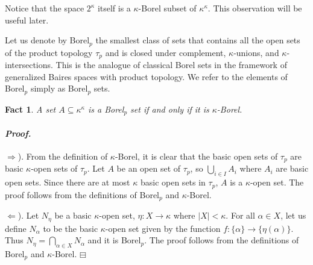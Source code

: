 \documentclass[12pt,a4paper]{amsart}
\newtheorem{thm}{Theorem}[section]
\newtheorem{fact}[thm]{Fact}
\theoremstyle{definition}
\theoremstyle{remark}
\newenvironment{cproof}{\paragraph{\emph{Proof.\,}}}{\hfill{$\boxminus$}\par\vspace{2mm}}
\begin{document}

Notice that the space $2^\kappa$ itself is a $\kappa$-Borel subset of $\kappa^\kappa$. This observation will be useful later.


Let us denote by Borel\hspace{1pt}$_p$ the smallest class of sets that contains all the open sets of the product topology $\tau_p$ and is closed under complement, $\kappa$-unions, and $\kappa$-intersections. This is the analogue of classical Borel sets in the framework of generalized Baires spaces with product topology. We refer to the elements of Borel\hspace{1pt}$_p$ simply as Borel\hspace{1pt}$_p$ sets. 

\begin{fact}\label{2.7}
    A set $A\subseteq \kappa^\kappa$ is a Borel\hspace{1pt}$_p$ set if and only if it is  $\kappa$-Borel.
\end{fact}
\begin{cproof}
    $\Rightarrow$). From the definition of $\kappa$-Borel, it is clear that the basic open sets of $\tau_p$ are basic $\kappa$-open sets of $\tau_p$. Let $A$ be an open set of $\tau_p$, so $\bigcup_{i\in I}A_i$ where $A_i$ are basic open sets. Since there are at most $\kappa$ basic open sets in $\tau_p$, $A$ is a $\kappa$-open set. The proof follows from the definitions of Borel\hspace{1pt}$_p$ and $\kappa$-Borel.

    $\Leftarrow$). Let $N_\eta$ be a basic $\kappa$-open set, $\eta:X\rightarrow \kappa$ where $|X|<\kappa$. For all $\alpha\in X$, let us define $N_\alpha$ to be the basic $\kappa$-open set given by the function $f:\{\alpha\}\rightarrow\{\eta(\alpha)\}$. Thus $N_\eta=\bigcap_{\alpha\in X}N_\alpha$ and it is Borel\hspace{1pt}$_p$. The proof follows from the definitions of Borel\hspace{1pt}$_p$ and $\kappa$-Borel.
\end{cproof}
\end{document}
